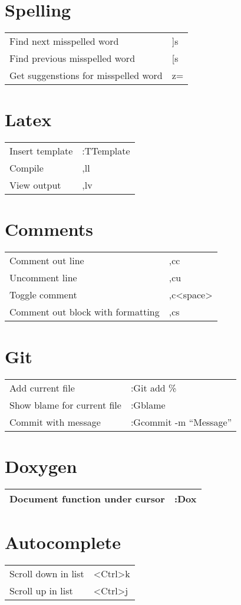 \documentclass[a4paper]{report}
\def \tablewidth {9cm}
\begin{document}
\tableofcontents
\newpage

\section{Spelling}
\begin{tabularx}{\tablewidth}{| X | l |}
  \hline
  Find next misspelled word & ]s \\
  Find previous misspelled word & [s \\
  Get suggenstions for misspelled word & z= \\
  \hline
\end{tabularx}

\section{Latex}
\begin{tabularx}{\tablewidth}{| X | l |}
  \hline
  Insert template & :TTemplate \\
  Compile & ,ll \\
  View output & ,lv\\
  \hline
\end{tabularx}

\section{Comments}
\begin{tabularx}{\tablewidth}{| X | l |}
  \hline
  Comment out line & ,cc \\
  Uncomment line & ,cu \\
  Toggle comment & ,c\textless space\textgreater \\
  Comment out block with formatting & ,cs \\
  \hline
\end{tabularx}

\section{Git}
\begin{tabularx}{\tablewidth}{| X | l |}
  \hline
  Add current file & :Git add \% \\
  Show blame for current file & :Gblame \\
  Commit with message & :Gcommit -m ``Message'' \\
  \hline
\end{tabularx}

\section{Doxygen}
\begin{tabularx}{\tablewidth}{| X | l |}
  \hline
  Document function under cursor & :Dox \\
  \hline
\end{tabularx}

\section{Autocomplete}
\begin{tabularx}{\tablewidth}{| X | l |}
  \hline
  Scroll down in list & \textless Ctrl\textgreater k \\
  Scroll up in list & \textless Ctrl\textgreater j \\
  \hline
\end{tabularx}
\end{document}
